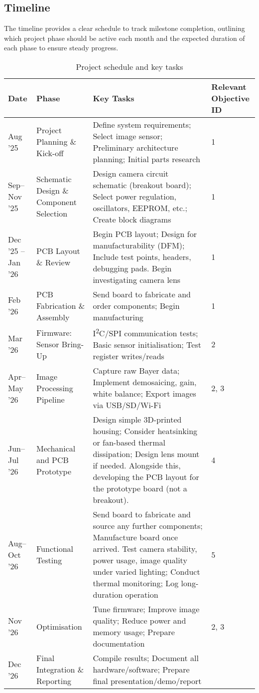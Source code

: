 \documentclass[10pt]{article}
\begin{document}
\subsection{Timeline}
The timeline provides a clear schedule to track milestone completion, outlining which project phase should be active each month and the expected duration of each phase to ensure steady progress.

\begin{table}[H]
\centering
\begin{tabular}{|p{1.5cm}|p{3cm}|p{7.5cm}|p{2cm}|}
\hline
\textbf{Date} & \textbf{Phase} & \textbf{Key Tasks} & \textbf{Relevant Objective ID} \\
\hline
Aug '25 & Project Planning \& Kick-off & Define system requirements; Select image sensor; Preliminary architecture planning; Initial parts research & 1 \\
\hline
Sep--Nov '25 & Schematic Design \& Component Selection & Design camera circuit schematic (breakout board); Select power regulation, oscillators, EEPROM, etc.; Create block diagrams & 1 \\
\hline
Dec '25 -- Jan '26 & PCB Layout \& Review & Begin PCB layout; Design for manufacturability (DFM); Include test points, headers, debugging pads. Begin investigating camera lens & 1 \\
\hline
Feb '26 & PCB Fabrication \& Assembly & Send board to fabricate and order components; Begin manufacturing & 1 \\
\hline
Mar '26 & Firmware: Sensor Bring-Up & I\textsuperscript{2}C/SPI communication tests; Basic sensor initialisation; Test register writes/reads & 2 \\
\hline
Apr--May '26 & Image Processing Pipeline & Capture raw Bayer data; Implement demosaicing, gain, white balance; Export images via USB/SD/Wi-Fi & 2, 3 \\
\hline
Jun--Jul '26 & Mechanical and PCB Prototype & Design simple 3D-printed housing; Consider heatsinking or fan-based thermal dissipation; Design lens mount if needed. Alongside this, developing the PCB layout for the prototype board (not a breakout). & 4 \\
\hline
Aug--Oct '26 & Functional Testing & Send board to fabricate and source any further components; Manufacture board once arrived. Test camera stability, power usage, image quality under varied lighting; Conduct thermal monitoring; Log long-duration operation & 5 \\
\hline
Nov '26 & Optimisation & Tune firmware; Improve image quality; Reduce power and memory usage; Prepare documentation & 2, 3 \\
\hline
Dec '26 & Final Integration \& Reporting & Compile results; Document all hardware/software; Prepare final presentation/demo/report &  \\
\hline
\end{tabular}
\caption{Project schedule and key tasks}
\label{tab:project_schedule}
\end{table}
\end{document}
